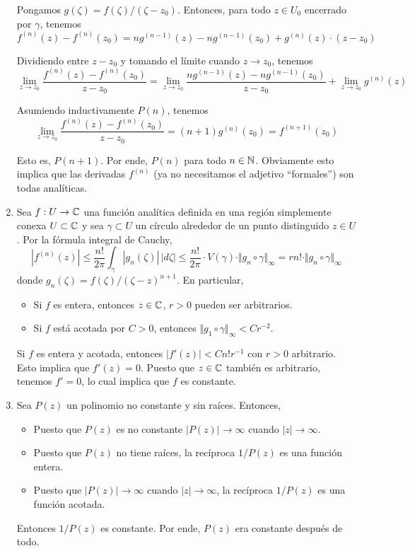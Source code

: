 \begin{solution}
\begin{enumerate}[label=(\alph*)]
    Pongamos $g(\zeta) = f(\zeta) / (\zeta - z_0)$. Entonces, para todo $z \in U_0$ encerrado por $\gamma$, tenemos
    $$f^{(n)}(z) - f^{(n)}(z_0) = ng^{(n-1)}(z) - ng^{(n-1)}(z_0) + g^{(n)}(z) \cdot (z - z_0)$$
    
    Dividiendo entre $z - z_0$ y tomando el límite cuando $z \to z_0$, tenemos
    $$
    \lim_{z \to z_0} \frac {f^{(n)}(z) - f^{(n)}(z_0)} {z - z_0}
        = \lim_{z \to z_0} \frac {ng^{(n-1)}(z) - ng^{(n-1)}(z_0)} {z - z_0}
        + \lim_{z \to z_0} g^{(n)}(z)
    $$
    
    Asumiendo inductivamente $P(n)$, tenemos
    $$\lim_{z \to z_0} \frac {f^{(n)}(z) - f^{(n)}(z_0)} {z - z_0} = (n+1) g^{(n)}(z_0) = f^{(n+1)}(z_0)$$
    
    Esto es, $P(n+1)$. Por ende, $P(n)$ para todo $n \in \mathbb N$. Obviamente esto implica que las derivadas $f^{(n)}$ (ya no necesitamos el adjetivo ``formales'') son todas analíticas.
    
    \item Sea $f : U \to \mathbb C$ una función analítica definida en una región simplemente conexa $U \subset \mathbb C$ y sea $\gamma \subset U$ un círculo alrededor de un punto distinguido $z \in U$. Por la fórmula integral de Cauchy,
    $$|f^{(n)}(z)| \le \frac {n!} {2\pi} \int_\gamma |g_n(\zeta)| \, |d\zeta| \le \frac {n!} {2\pi} \cdot V(\gamma) \cdot \Vert g_n \circ \gamma \Vert_\infty = rn! \cdot \Vert g_n \circ \gamma \Vert_\infty$$
    donde $g_n(\zeta) = f(\zeta) / (\zeta - z)^{n+1}$. En particular,
    \begin{itemize}
        \item Si $f$ es entera, entonces $z \in \mathbb C$, $r > 0$ pueden ser arbitrarios.
        \item Si $f$ está acotada por $C > 0$, entonces $\Vert g_1 \circ \gamma \Vert_\infty < Cr^{-2}$.
    \end{itemize}
    
    Si $f$ es entera y acotada, entonces $|f'(z)| < Cn! r^{-1}$ con $r > 0$ arbitrario. Esto implica que $f'(z) = 0$. Puesto que $z \in \mathbb C$ también es arbitrario, tenemos $f' = 0$, lo cual implica que $f$ es constante.
    
    \item Sea $P(z)$ un polinomio no constante y sin raíces. Entonces,
    
    \begin{itemize}
        \item Puesto que $P(z)$ es no constante $|P(z)| \to \infty$ cuando $|z| \to \infty$.
        \item Puesto que $P(z)$ no tiene raíces, la recíproca $1/P(z)$ es una función entera.
        \item Puesto que $|P(z)| \to \infty$ cuando $|z| \to \infty$, la recíproca $1/P(z)$ es una función acotada.
    \end{itemize}
    
    Entonces $1/P(z)$ es constante. Por ende, $P(z)$ era constante después de todo.
\end{enumerate}
\end{solution}
